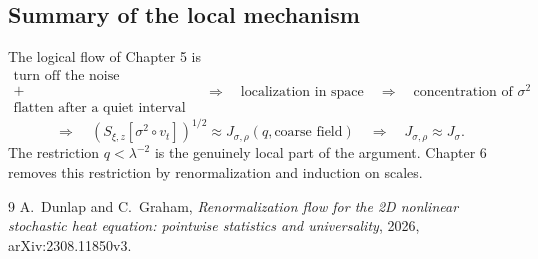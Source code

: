 \documentclass[11pt]{article}
\theoremstyle{definition}
\theoremstyle{remark}
\begin{document}
\subsection{Summary of the local mechanism}

The logical flow of Chapter 5 is
\[
\boxed{
\begin{array}{c}
\text{turn off the noise}\\
+\\
\text{flatten after a quiet interval}
\end{array}}
\quad\Longrightarrow\quad
\boxed{\text{localization in space}}
\quad\Longrightarrow\quad
\boxed{\text{concentration of }\sigma^2}
\]
\[
\Longrightarrow\quad
\boxed{
(S_{\xi,z}[\sigma^2\circ v_t])^{1/2}
\approx J_{\sigma,\rho}(q,\text{coarse field})}
\quad\Longrightarrow\quad
\boxed{J_{\sigma,\rho}\approx J_\sigma}.
\]
The restriction \(q<\lambda^{-2}\) is the genuinely local part of the argument. Chapter 6 removes this restriction by renormalization and induction on scales.

\begin{thebibliography}{9}
A.~Dunlap and C.~Graham,
\emph{Renormalization flow for the 2D nonlinear stochastic heat equation: pointwise statistics and universality},
2026, arXiv:2308.11850v3.
\end{thebibliography}
\end{document}
